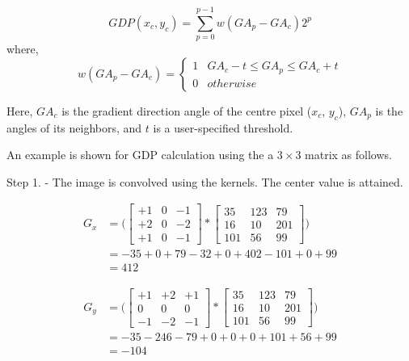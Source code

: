 \documentclass[conference]{IEEEtran}
\begin{document}
\begin{equation}
GDP ({x_c, y_c})=\sum_{p=0}^{p-1} w (GA_p - GA_c) 2^p
\end{equation}
where,
\begin{equation}
 w (GA_p - GA_c) =
\begin{cases}
1 & GA_c - t \leq GA_p \leq GA_c + t\\
0 & otherwise
\end{cases}
\end{equation}

Here, $GA_c$ is the gradient direction angle of the centre pixel ($x_c$, $y_c$), $GA_p$ is the angles of its neighbors, and $t$ is a user-specified threshold.

An example is shown for GDP calculation using the a $3 \times 3$ matrix as follows.

Step 1. - The image is convolved using the kernels. The center value is attained.

\begin{center}
	\[
	\begin{split}
	G_x & = \Bigg(
	\begin{bmatrix}
		+1 & 0 & -1 \\
		+2 & 0 & -2 \\
		+1 & 0 & -1
	\end{bmatrix}
	*
	\begin{bmatrix}
		35 & 123 & 79 \\
		16 & 10 & 201 \\
		101 & 56 & 99
	\end{bmatrix}\Bigg) \\
	& = -35 + 0 + 79 - 32 + 0 + 402 - 101 + 0 + 99 \\
	& = 412
	\end{split}
	\]
	
	\[
	\begin{split}
	G_y & = \Bigg(
	\begin{bmatrix}
	+1 & +2 & +1 \\
	0 & 0 & 0 \\
	-1 & -2 & -1
	\end{bmatrix}
	*
	\begin{bmatrix}
	35 & 123 & 79 \\
	16 & 10 & 201 \\
	101 & 56 & 99
	\end{bmatrix}\Bigg) \\
	& = -35 - 246 - 79 + 0 + 0 + 0 + 101 + 56 + 99 \\
	& = -104
	\end{split}
	\]
\end{center}
\end{document}
